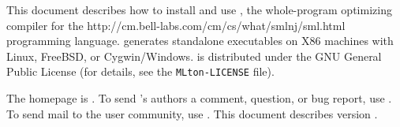 This document describes how to install and use {\mlton}, the
whole-program optimizing compiler for the
		  {http://cm.bell-labs.com/cm/cs/what/smlnj/sml.html}
programming language.
{\mlton} generates standalone executables on X86 machines with
Linux, FreeBSD, or Cygwin/Windows. 
{\mlton} is distributed under the GNU General Public License (for details, see
the {\tt MLton-LICENSE} file).

The {\mlton} homepage is \absolutelink{}.
To send {\mlton}'s authors a comment, question, or bug report, use
\mltonmail.
To send mail to the {\mlton} user community, use
.
This document describes {\mlton} version {\version}.

